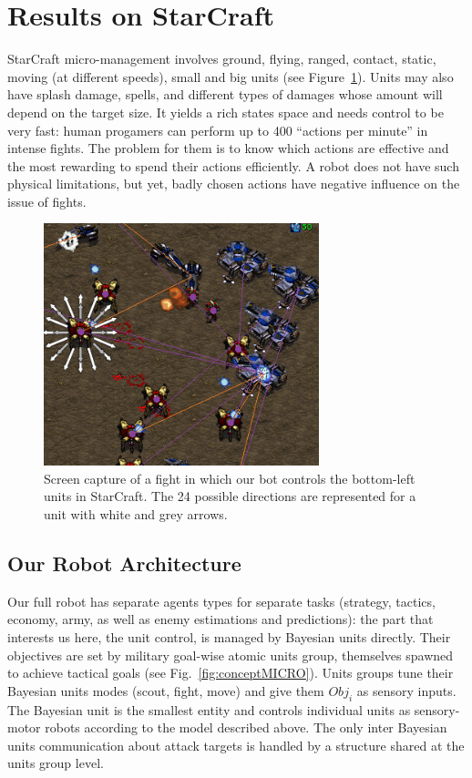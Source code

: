 \section{Results on StarCraft}
StarCraft micro-management involves ground, flying, ranged, contact, static, moving (at different speeds), small and big units (see Figure~\ref{fig:sc_fight}). Units may also have splash damage, spells, and different types of damages whose amount will depend on the target size. It yields a rich states space and needs control to be very fast: human progamers can perform up to 400 ``actions per minute'' in intense fights. The problem for them is to know which actions are effective and the most rewarding to spend their actions efficiently. A robot does not have such physical limitations, but yet, badly chosen actions have negative influence on the issue of fights. %
\begin{figure}
\begin{center}
\includegraphics[width=8cm]{images/SC_fight_3b.png}
\end{center}
\label{fig:sc_fight}
\caption{Screen capture of a fight in which our bot controls the bottom-left units in StarCraft. The 24 possible directions are represented for a unit with white and grey arrows.}
\end{figure}

\subsection{Our Robot Architecture}

Our full robot has separate agents types for separate tasks (strategy, tactics, economy, army, as well as enemy estimations and predictions): the part that interests us here, the unit control, is managed by Bayesian units directly. Their objectives are set by military goal-wise atomic units group, themselves spawned to achieve tactical goals (see Fig.~\ref{fig:conceptMICRO}). Units groups tune their Bayesian units modes (scout, fight, move) and give them $Obj_i$ as sensory inputs. The Bayesian unit is the smallest entity and controls individual units as sensory-motor robots according to the model described above. The only inter Bayesian units communication about attack targets is handled by a structure shared at the units group level.

